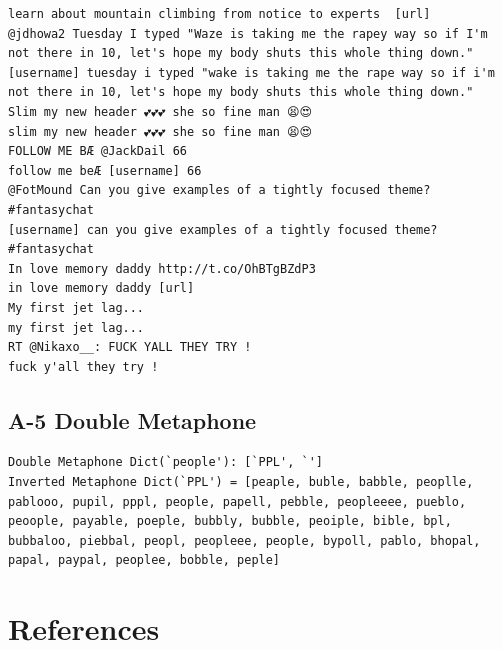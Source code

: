 \documentclass[twocolumn,10pt]{article}
\begin{document}
\begin{lstlisting}
learn about mountain climbing from notice to experts  [url]
@jdhowa2 Tuesday I typed "Waze is taking me the rapey way so if I'm not there in 10, let's hope my body shuts this whole thing down."
[username] tuesday i typed "wake is taking me the rape way so if i'm not there in 10, let's hope my body shuts this whole thing down."
Slim my new header 💕💕💕 she so fine man 😫😍
slim my new header 💕💕💕 she so fine man 😫😍
FOLLOW ME BÆ @JackDail 66
follow me beÆ [username] 66
@FotMound Can you give examples of a tightly focused theme? #fantasychat
[username] can you give examples of a tightly focused theme? #fantasychat
In love memory daddy http://t.co/OhBTgBZdP3
in love memory daddy [url]
My first jet lag...
my first jet lag...
RT @Nikaxo__: FUCK YALL THEY TRY !
fuck y'all they try !
\end{lstlisting}

\subsection*{A-5 Double Metaphone}
\begin{lstlisting}
Double Metaphone Dict(`people'): [`PPL', `']
Inverted Metaphone Dict(`PPL') = [peaple, buble, babble, peoplle, pablooo, pupil, pppl, people, papell, pebble, peopleeee, pueblo, peoople, payable, poeple, bubbly, bubble, peoiple, bible, bpl, bubbaloo, piebbal, peopl, peopleee, people, bypoll, pablo, bhopal, papal, paypal, peoplee, bobble, peple]
\end{lstlisting}


\section*{References}
\end{document}
